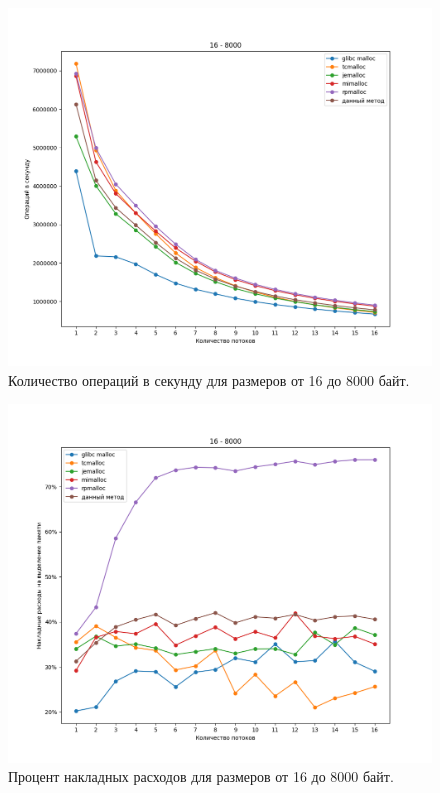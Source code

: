 \begin{figure}[!h]
	\begin{center}
		\includegraphics[width=1.0\linewidth, height=0.37\textheight]{images/16_8000_ops.png}
		\caption{Количество операций в секунду для размеров от 16 до 8000 байт.}
		\label{16_8000_ops}
	\end{center}
\end{figure}

\begin{figure}[!h]
	\begin{center}
		\includegraphics[width=1.0\linewidth, height=0.37\textheight]{images/16_8000_overhead.png}
		\caption{Процент накладных расходов для размеров от 16 до 8000 байт.}
		\label{16_8000_overhead}
	\end{center}
\end{figure}

